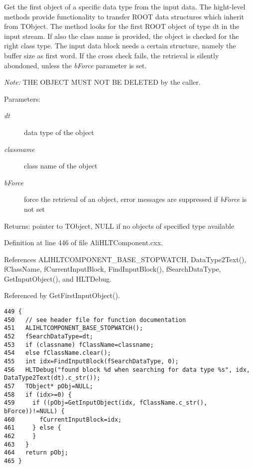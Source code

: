 Get the first object of a specific data type from the input data. The hight-level methods provide functionality to transfer ROOT data structures which inherit from TObject. The method looks for the first ROOT object of type dt in the input stream. If also the class name is provided, the object is checked for the right class type. The input data block needs a certain structure, namely the buffer size as first word. If the cross check fails, the retrieval is silently abondoned, unless the {\em b\-Force\/} parameter is set.\par
 {\em Note:\/} THE OBJECT MUST NOT BE DELETED by the caller. \begin{Desc}
\item[Parameters:]
\begin{description}
\item[{\em dt}]data type of the object \item[{\em classname}]class name of the object \item[{\em b\-Force}]force the retrieval of an object, error messages are suppressed if {\em b\-Force\/} is not set \end{description}
\end{Desc}
\begin{Desc}
\item[Returns:]pointer to TObject, NULL if no objects of specified type available \end{Desc}


Definition at line 446 of file Ali\-HLTComponent.cxx.

References ALIHLTCOMPONENT\_\-BASE\_\-STOPWATCH, Data\-Type2Text(), f\-Class\-Name, f\-Current\-Input\-Block, Find\-Input\-Block(), f\-Search\-Data\-Type, Get\-Input\-Object(), and HLTDebug.

Referenced by Get\-First\-Input\-Object().

\footnotesize\begin{verbatim}449 {
450   // see header file for function documentation
451   ALIHLTCOMPONENT_BASE_STOPWATCH();
452   fSearchDataType=dt;
453   if (classname) fClassName=classname;
454   else fClassName.clear();
455   int idx=FindInputBlock(fSearchDataType, 0);
456   HLTDebug("found block %d when searching for data type %s", idx, DataType2Text(dt).c_str());
457   TObject* pObj=NULL;
458   if (idx>=0) {
459     if ((pObj=GetInputObject(idx, fClassName.c_str(), bForce))!=NULL) {
460       fCurrentInputBlock=idx;
461     } else {
462     }
463   }
464   return pObj;
465 }
\end{verbatim}\normalsize 


